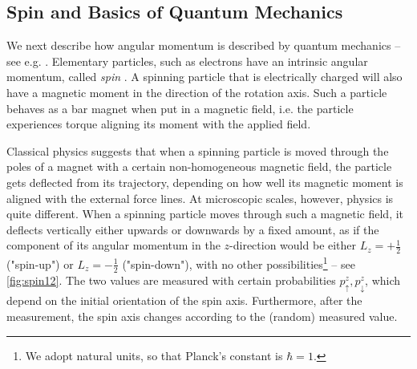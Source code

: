 \documentclass[final,3p,mathptmx]{elsarticle}
\begin{document}
\subsection{Spin and Basics of Quantum Mechanics}\label{sec:rotational:quantum}
We next describe how angular momentum is described by quantum mechanics -- see e.g. \cite{penrose2006road,townsend2000modern}. Elementary particles, such as electrons have an intrinsic angular momentum, called \emph{spin} \cite{weiss2001spin}. A spinning particle that is electrically charged will also have a magnetic moment in the direction of the rotation axis. Such a particle behaves as a bar magnet when put in a magnetic field, i.e. the particle experiences torque aligning its moment with the applied field.

Classical physics suggests that when a spinning particle is moved through the poles of a magnet with a certain non-homogeneous magnetic field, the particle gets deflected from its trajectory, depending on how well its magnetic moment is aligned with the external force lines. At microscopic scales, however, physics is quite different. When a spinning particle moves through such a magnetic field, it deflects vertically either upwards or downwards by a fixed amount, as if the component of its angular momentum in the $z$-direction would be either $L_z = +\frac{1}{2}$ ("spin-up") or $L_z = -\frac{1}{2}$ ("spin-down"), with no other possibilities\footnote{We adopt natural units, so that Planck's constant is $\hbar = 1$.} -- see \autoref{fig:spin12}. The two values are measured with certain probabilities $p^{z}_{\uparrow}, p^{z}_{\downarrow}$, which depend on the initial orientation of the spin axis. Furthermore, after the measurement, the spin axis changes according to the (random) measured value.
\end{document}
